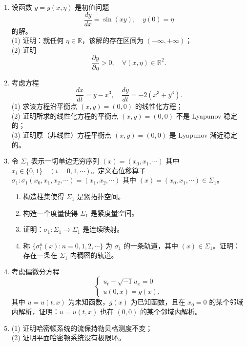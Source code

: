 \begin{enumerate}
    \item[一、] 设函数 \( y = y(x, \eta) \) 是初值问题
          \[\frac{dy}{dx} = \sin(xy), \quad y(0) = \eta\]
          的解。\\
          (1) 证明：就任何 \(\eta \in \mathbb{R}\)，该解的存在区间为 \((-\infty, +\infty)\)；\\
          (2) 证明
          \[\frac{\partial y}{\partial \eta} > 0, \quad \forall (x, \eta) \in \mathbb{R}^2.\]

    \item[二、] 考虑方程
          \[\frac{dx}{dt} = y - x^3, \quad \frac{dy}{dt} = -2(x^3 + y^3).\]
          (1) 求该方程沿平衡点 \((x, y) = (0, 0)\) 的线性化方程；\\
          (2) 证明所求的线性化方程的平衡点 \((x, y) = (0, 0)\) 不是 Lyapunov 稳定的；\\
          (3) 证明原（非线性）方程平衡点 \((x, y) = (0, 0)\) 是 Lyapunov 渐近稳定的。

    \item[三、] 令 \(\Sigma_1\) 表示一切单边无穷序列 \((x) = (x_0, x_1, \cdots)\) 其中 \(x_i \in \{0, 1\} \quad (i = 0, 1, \cdots)\)。定义右位移算子 \(\sigma_1: \sigma_1(x_0, x_1, x_2, \cdots) = (x_1, x_2, \cdots)\) 其中 \((x) = (x_0, x_1, \cdots) \in \Sigma_1\)。
          \begin{enumerate}
              \item 构造柱集使得 \(\Sigma_1\) 是紧拓扑空间。
              \item 构造一个度量使得 \(\Sigma_1\) 是紧度量空间。
              \item 证明：\(\sigma_1: \Sigma_1 \to \Sigma_1\) 是连续映射。
              \item 称 \(\{\sigma_1^n(x): n = 0, 1, 2, \cdots\}\) 为 \(\sigma_1\) 的一条轨道，其中 \((x) \in \Sigma_1\)。证明：存在一条在 \(\Sigma_1\) 内稠密的轨道。
          \end{enumerate}

    \item[四、] 考虑偏微分方程
          \[\begin{cases}
              u_t - \sqrt{-1} u_x = 0 \\
              u(0,x) = g(x),
          \end{cases}\]
          其中 \( u = u(t, x) \) 为未知函数，\( g(x) \) 为已知函数，且在 \( x_0 = 0 \) 的某个邻域内解析，证明：\( u = u(t, x) \) 也在 \((0, 0)\) 的某个邻域内解析。

    \item[五、] (1) 证明哈密顿系统的流保持勒贝格测度不变；\\
          (2) 证明平面哈密顿系统没有极限环。


\end{enumerate}
